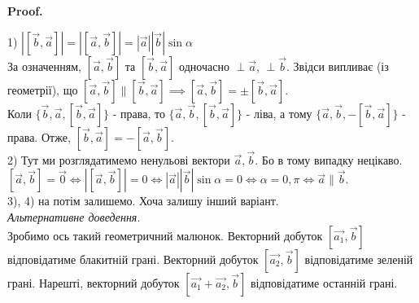 \documentclass[a4paper, 10pt]{extarticle}
\makeatletter
\def\qed{$\blacksquare$}
\def\qed{$\blacksquare$}
\theoremstyle{theoremdd}
\theoremstyle{theoremdd}
\theoremstyle{theoremdd}
\theoremstyle{theoremdd}
\theoremstyle{theoremdd}
\theoremstyle{theoremdd}
\theoremstyle{theoremdd}
\theoremstyle{theoremdd}
\renewenvironment{proof}[1][Proof.\\]{\par
\pushQED{\hfill \qed}%
\normalfont \topsep6\p@\@plus6\p@\relax
\trivlist
\item\relax
{\bfseries
#1\@addpunct{.}}\hspace\labelsep\ignorespaces
}{%
\popQED\endtrivlist\@endpefalse
}
\makeatother
\begin{document}
\begin{proof}
1) $|[\vec{b}, \vec{a}]| = |[\vec{a}, \vec{b}]| = |\vec{a}| |\vec{b}| \sin \alpha$\\
За означенням, $[\vec{a}, \vec{b}]$ та $[\vec{b}, \vec{a}]$ одночасно $\perp \vec{a}$, $\perp \vec{b}$. Звідси випливає (із геометрії), що
$[\vec{a}, \vec{b}] \parallel [\vec{b}, \vec{a}] \implies [\vec{a}, \vec{b}] = \pm [\vec{b}, \vec{a}]$.\\
Коли $\{\vec{b}, \vec{a}, [\vec{b}, \vec{a}]\}$ - права, то $\{\vec{a}, \vec{b}, [\vec{b}, \vec{a}]\}$ - ліва, а тому $\{\vec{a}, \vec{b}, -[\vec{b}, \vec{a}]\}$ - права. Отже, $[\vec{b},\vec{a}] = -[\vec{a}, \vec{b}]$.
\bigskip \\
2) Тут ми розглядатимемо ненульові вектори $\vec{a},\vec{b}$. Бо в тому випадку нецікаво.\\
$[\vec{a}, \vec{b}] = \vec{0} \iff |[\vec{a}, \vec{b}]| = 0 \iff |\vec{a}| |\vec{b}| \sin \alpha = 0 \iff \alpha = 0,\pi \iff \vec{a} \parallel \vec{b}$.
\bigskip \\
3), 4) на потім залишемо. Хоча залишу інший варіант.\\
\textit{Альтернативне доведення.}\\
Зробимо ось такий геометричний малюнок. Векторний добуток $[\vec{a_1},\vec{b}]$ відповідатиме блакитній грані. Векторний добуток $[\vec{a_2},\vec{b}]$ відповідатиме зеленій грані. Нарешті, векторний добуток $[\vec{a_1}+\vec{a_2}, \vec{b}]$ відповідатиме останній грані.
\begin{figure}[H]
\centering
{}
\end{figure}
\end{proof}
\end{document}
